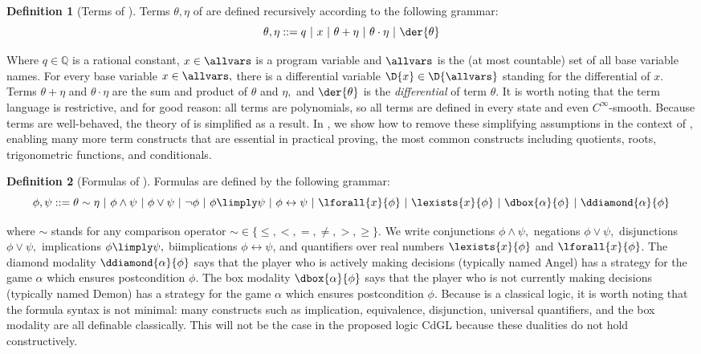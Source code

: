 \documentclass[12pt]{cmuthesis}
\theoremstyle{definition}
\newtheorem{definition}{Definition}
\theoremstyle{remark}
\newcommand{\bebecomes}{\mathrel{::=}}
\newcommand{\alternative}{~|~}
\newcommand{\rref}[2][]{\prettyref{#2}}
\newcommand{\lequiv}{\leftrightarrow}
\newcommand{\CdGL}{\textsf{CdGL}\xspace}
\begin{document}
\begin{definition}[Terms of \dGL]
Terms $\theta, \eta$ of \dGL are defined recursively according to the following grammar:
\[\theta,\eta \bebecomes q \alternative x \alternative \theta + \eta \alternative \theta \cdot \eta \alternative \der{\theta} \]
\end{definition}
Where $q \in \mathbb{Q}$ is a rational constant, $x \in \allvars$ is a program variable and $\allvars$ is the (at most countable) set of all base variable names.
For every base variable $x \in \allvars,$ there is a differential variable $\D{x} \in \D{\allvars}$ standing for the differential of $x$.
Terms $\theta + \eta$ and $\theta \cdot \eta$ are the sum and product of $\theta$ and $\eta,$ and $\der{\theta}$ is the \emph{differential} of term $\theta$.
It is worth noting that the \dGL term language is restrictive, and for good reason: all terms are polynomials, so all terms are defined in every state and even $C^\infty$-smooth.
Because \dGL terms are well-behaved, the theory of \dGL is simplified as a result.
In \rref{sec:definite-description}, we show how to remove these simplifying assumptions in the context of \dL, enabling many more term constructs that are essential in practical proving, the most common constructs including quotients, roots, trigonometric functions, and conditionals.


\begin{definition}[Formulas of \dGL]
  Formulas are defined by the following grammar:
\[\phi,\psi \bebecomes \theta \sim \eta \alternative \phi \land \psi \alternative \phi \lor \psi \alternative \neg \phi \alternative \phi \limply \psi \alternative \phi \lequiv \psi \alternative \lforall{x}{\phi} \alternative \lexists{x}{\phi} \alternative \dbox{\alpha}{\phi} \alternative \ddiamond{\alpha}{\phi}\]
\end{definition}
where $\sim$ stands for any comparison operator $\sim \in \{\leq, <, =, \neq, >, \geq\}$.
We write conjunctions $\phi \land \psi,$ negations $\phi \lor \psi,$ disjunctions $\phi \lor \psi,$ implications $\phi \limply \psi,$ biimplications $\phi \lequiv \psi$, and quantifiers over real numbers $\lexists{x}{\phi}$ and $\lforall{x}{\phi}$.
The diamond modality $\ddiamond{\alpha}{\phi}$ says that the player who is actively making decisions (typically named Angel) has a strategy for the game $\alpha$ which ensures postcondition $\phi$.
The box modality $\dbox{\alpha}{\phi}$ says that the player who is not currently making decisions (typically named Demon) has a strategy for the game $\alpha$ which ensures postcondition $\phi$.
Because \dGL is a classical logic, it is worth noting that the formula syntax is not minimal: many constructs such as implication, equivalence, disjunction, universal quantifiers, and the box modality are all definable classically.
This will not be the case in the proposed logic \CdGL because these dualities do not hold constructively.
\end{document}
